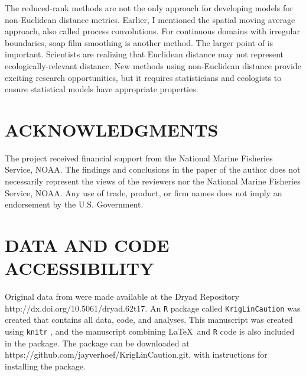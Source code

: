 \documentclass[11pt, titlepage]{article}\usepackage[]{graphicx}\usepackage[]{color}
\begin{document}
\begin{spacing}{1.9}
\begin{flushleft}
The reduced-rank methods are not the only approach for developing models for non-Euclidean distance metrics.  Earlier, I mentioned the spatial moving average approach, also called process convolutions.  For continuous domains with irregular boundaries, soap film smoothing \citep{Wood:Brav:Hedl:soap:2008} is another method. The larger point of \citet{Ladl:Avga:Whea:Boyc:pred:2016} is important. Scientists are realizing that Euclidean distance may not represent ecologically-relevant distance.  New methods using non-Euclidean distance provide exciting research opportunities, but it requires statisticians and ecologists to ensure statistical models have appropriate properties. 

\section*{ACKNOWLEDGMENTS} 

The project received financial support from the National Marine Fisheries Service, NOAA. The findings and conclusions in the paper of the author does not necessarily represent the views of the reviewers nor the National Marine Fisheries Service, NOAA. Any use of trade, product, or firm names does not imply an endorsement by the U.S. Government. 

\section*{DATA AND CODE ACCESSIBILITY}

Original data from \citet{Ladl:Avga:Whea:Boyc:pred:2016} were made available at the Dryad Repository http://dx.doi.org/10.5061/dryad.62t17. An \texttt{R} \citep{R:Deve:Core:ALan:2017} package called \texttt{KrigLinCaution} was created that contains all data, code, and analyses. This manuscript was created using \texttt{knitr} \citep{Yihu:impl:2014,Yihu:dyna:2015,Yihu:knit:2016}, and the manuscript combining \LaTeX\ and \texttt{R} code is also included in the package.  The package can be downloaded at https://github.com/jayverhoef/KrigLinCaution.git, with instructions for installing the package.

	


%
%





\end{flushleft}
\end{spacing}
\end{document}
